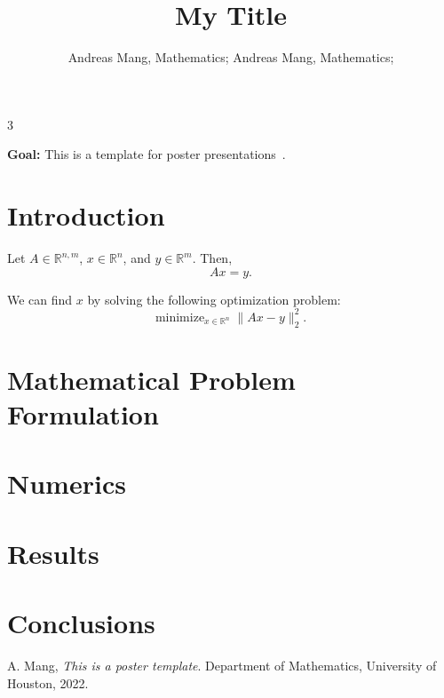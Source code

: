 \documentclass[plainsections,30pt]{sciposter}
\author{Andreas Mang, Mathematics; Andreas Mang, Mathematics;}
\title{My Title}
\def\numcols{3}
\begin{document}


\begin{multicols}{\numcols}

\begin{sectionbox}{}
\textbf{Goal:} This is a template for poster presentations~\cite{Mang:2022a}.
\end{sectionbox}


\section*{Introduction}

Let $A \in \mathbb{R}^{n,m}$, $x \in \mathbb{R}^n$, and $y \in \mathbb{R}^m$. Then,
\[
A x = y.
\]

We can find $x$ by solving the following optimization problem:
\[
\text{minimize}_{x\in\mathbb{R}^n} \; \|Ax-y\|_2^2.
\]

\section*{Mathematical Problem Formulation}


\section*{Numerics}


\section*{Results}


\section*{Conclusions}


\begin{footnotesize}
\begin{thebibliography}{9}
 A. Mang, {\em This is a poster template}. Department of Mathematics, University of Houston, 2022.
\end{thebibliography}
\end{footnotesize}

\end{multicols}
\end{document}
